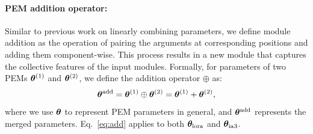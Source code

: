 
\paragraph{PEM addition operator:} 
Similar to previous work on linearly combining parameters, 
we define module addition as the operation of pairing the arguments at corresponding positions and adding them component-wise. 
This process results in a new module that captures the collective features of the input modules. 
Formally, for parameters of two PEMs ${\bm{\theta}}^{(1)}$ and ${\bm{\theta}}^{(2)}$, we define the addition operator $\oplus$ as:
\begin{equation}
\label{eq:add}
    {\bm{\theta}}^{\text{add}} = {\bm{\theta}}^{(1)} \oplus {\bm{\theta}}^{(2)} = {\bm{\theta}}^{(1)} + {\bm{\theta}}^{(2)},
\end{equation}
where we use ${\bm{\theta}}$ to represent PEM parameters in general, and ${\bm{\theta}}^{\text{add}}$ represents the merged parameters. 
Eq.~\ref{eq:add} applies to both ${\bm{\theta}}_{\text{lora}}$ and ${\bm{\theta}}_{\text{ia3}}$.






